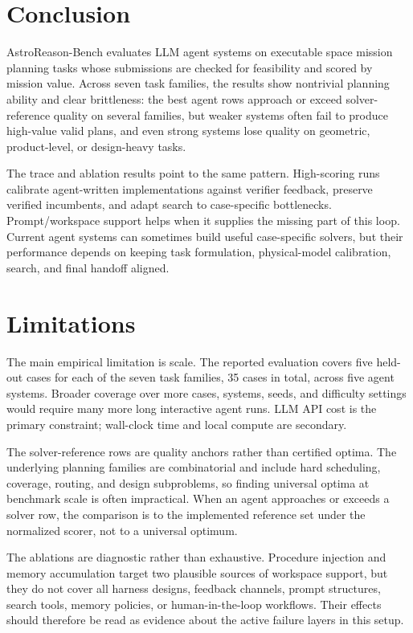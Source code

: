 \documentclass[11pt]{article}
\begin{document}
\section{Conclusion}
\label{sec:conclusion}

AstroReason-Bench evaluates LLM agent systems on executable space mission planning tasks whose submissions are checked for feasibility and scored by mission value. Across seven task families, the results show nontrivial planning ability and clear brittleness: the best agent rows approach or exceed solver-reference quality on several families, but weaker systems often fail to produce high-value valid plans, and even strong systems lose quality on geometric, product-level, or design-heavy tasks.

The trace and ablation results point to the same pattern. High-scoring runs calibrate agent-written implementations against verifier feedback, preserve verified incumbents, and adapt search to case-specific bottlenecks. Prompt/workspace support helps when it supplies the missing part of this loop. Current agent systems can sometimes build useful case-specific solvers, but their performance depends on keeping task formulation, physical-model calibration, search, and final handoff aligned.

\section*{Limitations}

The main empirical limitation is scale. The reported evaluation covers five held-out cases for each of the seven task families, 35 cases in total, across five agent systems. Broader coverage over more cases, systems, seeds, and difficulty settings would require many more long interactive agent runs. LLM API cost is the primary constraint; wall-clock time and local compute are secondary.

The solver-reference rows are quality anchors rather than certified optima. The underlying planning families are combinatorial and include hard scheduling, coverage, routing, and design subproblems, so finding universal optima at benchmark scale is often impractical. When an agent approaches or exceeds a solver row, the comparison is to the implemented reference set under the normalized scorer, not to a universal optimum.

The ablations are diagnostic rather than exhaustive. Procedure injection and memory accumulation target two plausible sources of workspace support, but they do not cover all harness designs, feedback channels, prompt structures, search tools, memory policies, or human-in-the-loop workflows. Their effects should therefore be read as evidence about the active failure layers in this setup.
\end{document}
